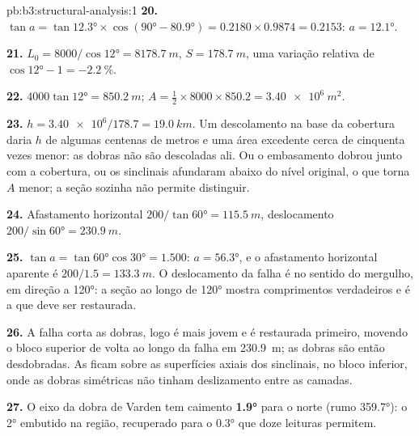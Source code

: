 \begin{solution}{pb:b3:structural-analysis:1}
\textbf{20.} $\tan a = \tan\ang{12.3}\times\cos(\ang{90} - \ang{80.9}) =
0.2180\times0.9874 = 0.2153$: $a = \ang{12.1}$.

\textbf{21.} $L_0 = 8000/\cos\ang{12} = \qty{8178.7}{m}$, $S =
\qty{178.7}{m}$, uma variação relativa de $\cos\ang{12} - 1 =
\qty{-2.2}{\percent}$.

\textbf{22.} $4000\tan\ang{12} = \qty{850.2}{m}$; $A = \tfrac12\times8000\times
850.2 = \qty{3.40e6}{m^2}$.

\textbf{23.} $h = \num{3.40e6}/178.7 = \qty{19.0}{km}$. Um descolamento na
base da cobertura daria $h$ de algumas centenas de metros e uma área excedente
cerca de cinquenta vezes menor: as dobras não são descoladas ali. Ou o
embasamento dobrou junto com a cobertura, ou os sinclinais afundaram abaixo do
nível original, o que torna $A$ menor; a seção sozinha não permite distinguir.

\textbf{24.} Afastamento horizontal $200/\tan\ang{60} = \qty{115.5}{m}$, deslocamento $200/\sin\ang{60}
= \qty{230.9}{m}$.

\textbf{25.} $\tan a = \tan\ang{60}\cos\ang{30} = 1.500$: $a = \ang{56.3}$, e
o afastamento horizontal aparente é $200/1.5 = \qty{133.3}{m}$. O deslocamento da falha é
no sentido do mergulho, em direção a \ang{120}: a seção ao longo de \ang{120} mostra
comprimentos verdadeiros e é a que deve ser restaurada.

\textbf{26.} A falha corta as dobras, logo é mais jovem e é restaurada primeiro,
movendo o bloco superior de volta ao longo da falha em \qty{230.9}{m}; as dobras são
então desdobradas. As  ficam sobre as superfícies axiais dos sinclinais, no
bloco inferior, onde as dobras simétricas não tinham deslizamento entre as camadas.

\textbf{27.} O eixo da dobra de Varden tem caimento
\textbf{\ang[text-series-to-math=true]{1.9}} para o norte (rumo
\ang{359.7}): o \ang{2} embutido na região, recuperado para o
\ang{0.3} que doze leituras permitem.
\end{solution}
